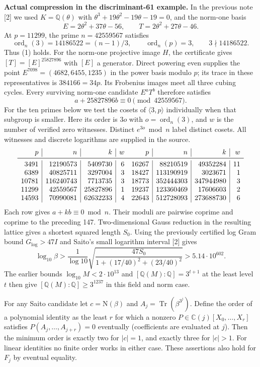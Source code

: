 \documentclass[11pt,a4paper,oneside,openany]{book}
\newcommand{\Q}{\mathbb Q}\newcommand{\C}{\mathbb C}\newcommand{\Z}{\mathbb Z}\newcommand{\F}{\mathbb F}\newcommand{\Tr}{\operatorname{Tr}}\newcommand{\Nm}{\operatorname{N}}\newcommand{\ord}{\operatorname{ord}}\newcommand{\K}{K}\newcommand{\OO}{\mathcal O_K}\newcommand{\unit}{\mathcal U}
\begin{document}
\textbf{Actual compression in the discriminant-61 example.} In the previous note [2] we used $K=\Q(\theta)$ with $\theta^3+19\theta^2-19\theta-19=0$, and the norm-one basis
\[
          E=2\theta^2+37\theta-56,\qquad T=2\theta^2+27\theta-46 .
\]
At $p=11299$, the prime $n=42559567$ satisfies
\[
 \ord_n(3)=14186522=(n-1)/3,\qquad \ord_n(p)=3,\qquad
                    3\nmid 14186522 .
\]
Thus (1) holds. For the norm-one projective image $H$, the certificate gives $[T]=[E]^{25827896}$ with $[E]$ a generator. Direct powering even supplies the point $E^{7098}=(4682,6455,1235)$ in the power basis modulo $p$; its trace in these representatives is $384166=34p$. Its Frobenius images meet all three cubing cycles. Every surviving norm-one candidate $E^aT^b$ therefore satisfies
\[
                     a+25827896 b\equiv0\pmod{42559567}.          \tag{2}
\]
For the ten primes below we test the cosets of $\langle3,p\rangle$ individually when that subgroup is smaller. Here its order is $3o$ with $o=\ord_n(3)$, and $w$ is the number of verified zero witnesses. Distinct $e^{3o}\bmod n$ label distinct cosets. All witnesses and discrete logarithms are supplied in the source.
\[
\begin{array}{r|r|r|r@{\quad}r|r|r|r}
p& n& k & w & p & n& k&w\\\midrule
3491&12190573&5409730&6&16267&88210519&49352284&11\\
6389&40825711&3297004&3&18427&113190919&3023671&1\\
10781&116240743&7713735&3&18773&352444303&347944980&3\\
11299&42559567&25827896&1&19237&123360469&17606603&2\\
14593&70990081&62632233&4&22643&512728093&273688730&6
\end{array}
\]
Each row gives $a+kb\equiv0\bmod n$. Their moduli are pairwise coprime and coprime to the preceding 147. Two-dimensional Gauss reduction in the resulting lattice gives a shortest squared length $S_0$. Using the previously certified log Gram bound $G_{\log}>47I$ and Saito's small logarithm interval [2] gives
\[
 \log_{10}\beta >
 \frac{1}{\log 10}\sqrt{\frac{47S_0}{1+(17/40)^2+(23/40)^2}}
 >5.14\cdot10^{602}.
\]
The earlier bounds $\log_{10}M<2\cdot10^{13}$ and $[\Q(M):\Q]=3^{t+1}$ at the least level $t$ then give $[\Q(M):\Q]\ge3^{1237}$ in this field and norm case.


For any Saito candidate let $c=\mathrm N(\beta)$ and $A_j=\Tr(\beta^{3^j})$. Define the order of a polynomial identity as the least $r$ for which a nonzero $P\in\C(j)[X_0,\ldots,X_r]$ satisfies $P(A_j,\ldots,A_{j+r})=0$ eventually  (coefficients are evaluated at $j$). Then the minimum order is exactly two for $|c|=1$, and exactly three for $|c|>1$. For linear identities no finite order works in either case. These assertions also hold for $F_j$ by eventual equality.
\end{document}
